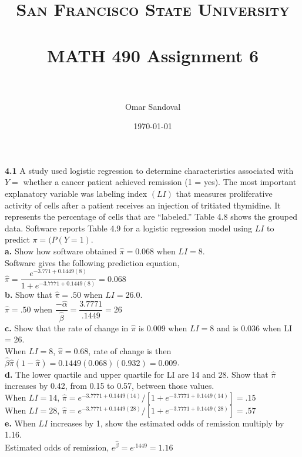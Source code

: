 \documentclass[paper=letter, fontsize=11pt]{scrartcl} %
\title{	
\normalfont \normalsize 
\textsc{San Francisco State University} \\ [25pt]
\horrule{0.5pt} \\[0.4cm] %
\huge MATH 490 Assignment 6  \\ %
\horrule{2pt} \\[0.5cm] %
}
\author{Omar Sandoval}
\date{\normalsize\today}
\begin{document}
\maketitle

\textbf{4.1} A study used logistic regression to determine characteristics associated
with $Y =$ whether a cancer patient achieved remission (1 = yes). The most important 
explanatory variable was labeling index $(LI)$ that measures proliferative activity of 
cells after a patient receives an injection of tritiated thymidine. It represents the 
percentage of cells that are ``labeled.'' Table 4.8 shows the grouped data. Software 
reports Table 4.9 for a logistic regression model using $LI$ to predict $\pi = (P(Y=1)$.
\\

\textbf{a.} Show how software obtained $\hat{\pi} = 0.068$ when $LI = 8$. \\
Software gives the following prediction equation, 
$\hat{\pi} = \dfrac{e^{-3.771+0.1449(8)}}{1+e^{-3.7771+0.1449(8)}} = 0.068$ 
\\

\textbf{b.} Show that $\hat{\pi} = .50$ when $LI = 26.0$. \\
$\hat{\pi} = .50$ when $\dfrac{-\hat{\alpha}}{\hat{\beta}} = \dfrac{3.7771}{.1449} = 26$
\\

\textbf{c.} Show that the rate of change in $\hat{\pi}$ is 0.009 when $LI = 8$ and is 
0.036 when LI = 26.\\
When $LI = 8$, $\hat{\pi} = 0.68$, rate of change is then 
$\hat{\beta}\hat{\pi}(1-\hat{\pi}) = 0.1449(0.068)(0.932) = 0.009$.
\\

\textbf{d.} The lower quartile and upper quartile for LI are 14 and 28. Show that 
$\hat{\pi}$ increases by 0.42, from 0.15 to 0.57, between those values. \\
When $LI = 14$, $\hat{\pi} = e^{-3.7771 + 0.1449(14)} / [1 + e^{-3.7771 + 0.1449(14)}]
= .15$ \\

When $LI = 28$, $\hat{\pi} = e^{-3.7771 + 0.1449(28)} / [1 + e^{-3.7771 + 0.1449(28)}]
= .57$ \\


\textbf{e.} When $LI$ increases by 1, show the estimated odds of remission multiply by
1.16. \\
Estimated odds of remission, $e^{\hat{\beta}} = e^{.1449} = 1.16$
\end{document}
